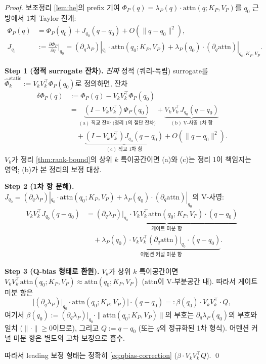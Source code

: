 \documentclass[11pt]{article}
\theoremstyle{definition}
\newcommand{\Phip}{\Phi_P}
\newcommand{\attn}{\mathrm{attn}}
\begin{document}
\begin{proof}
보조정리 \ref{lem:he}의 prefix 기여 $\Phip(q) = \lambda_P(q) \cdot \attn(q; K_P, V_P)$를 $q_0$ 근방에서 1차 Taylor 전개:
\begin{align}
\Phip(q) &= \Phip(q_0) + J_{q_0}(q-q_0) + O(\|q-q_0\|^2), \\
J_{q_0} &:= \frac{\partial \Phip}{\partial q}\bigg|_{q_0} = (\partial_q \lambda_P)|_{q_0} \cdot \attn(q_0; K_P, V_P) + \lambda_P(q_0) \cdot (\partial_q \attn)|_{q_0;K_P,V_P}.
\end{align}

\textbf{Step 1 (정적 surrogate 잔차).}
\emph{진짜} 정적 (쿼리-독립) surrogate를 $\widehat{\Phi}_k^{\mathrm{static}} := V_k V_k^\top \Phip(q_0)$로 정의하면, 잔차
\begin{align}
\delta\Phip(q) &:= \Phip(q) - V_k V_k^\top \Phip(q_0) \\
&= \underbrace{(I - V_k V_k^\top)\Phip(q_0)}_{(\mathrm{a})\;\text{직교 잔차 (정리 1의 절단 잔차)}} + \underbrace{V_k V_k^\top J_{q_0}(q - q_0)}_{(\mathrm{b})\;\text{V-사영 1차 항}} \nonumber\\
&\quad + \underbrace{(I - V_k V_k^\top) J_{q_0}(q - q_0)}_{(\mathrm{c})\;\text{직교 1차 항}} + O(\|q-q_0\|^2).
\end{align}
$V_k$가 정리 \ref{thm:rank-bound}의 상위 $k$ 특이공간이면 (a)와 (c)는 정리 1이 책임지는 영역; (b)가 본 정리의 보정 대상.

\textbf{Step 2 (1차 항 분해).}
$J_{q_0} = (\partial_q\lambda_P)|_{q_0} \cdot \attn(q_0; K_P, V_P) + \lambda_P(q_0) \cdot (\partial_q\attn)|_{q_0}$의 V-사영:
\begin{align}
V_k V_k^\top J_{q_0}(q-q_0) &= \underbrace{(\partial_q \lambda_P)|_{q_0} \cdot V_k V_k^\top \attn(q_0; K_P, V_P) \cdot (q-q_0)}_{\text{게이트 미분 항}} \nonumber \\
&\quad + \underbrace{\lambda_P(q_0) \cdot V_k V_k^\top (\partial_q \attn)|_{q_0} \cdot (q-q_0)}_{\text{어텐션 커널 미분 항}}.
\end{align}

\textbf{Step 3 (Q-bias 형태로 환원).}
$V_k$가 상위 $k$ 특이공간이면 $V_k V_k^\top \attn(q_0; K_P, V_P) \approx \attn(q_0; K_P, V_P)$ ($\attn$이 V-부분공간 내). 따라서 게이트 미분 항은
\begin{equation}
\bigl[(\partial_q\lambda_P)|_{q_0} \cdot \attn(q_0; K_P, V_P)\bigr] \cdot (q-q_0) =: \beta(q_0) \cdot V_k V_k^\top \cdot Q,
\end{equation}
여기서 $\beta(q_0) := (\partial_q\lambda_P)|_{q_0} \cdot \|\attn(q_0; K_P, V_P)\|$의 부호는 $\partial_q\lambda_P(q_0)$의 부호와 일치 ($\|\cdot\| \ge 0$이므로), 그리고 $Q := q - q_0$ (또는 $q$의 정규화된 1차 형식). 어텐션 커널 미분 항은 별도의 고차 보정으로 흡수.

따라서 leading 보정 형태는 정확히 \eqref{eq:qbias-correction} ($\beta\cdot V_k V_k^\top Q$). \qed
\end{proof}
\end{document}
